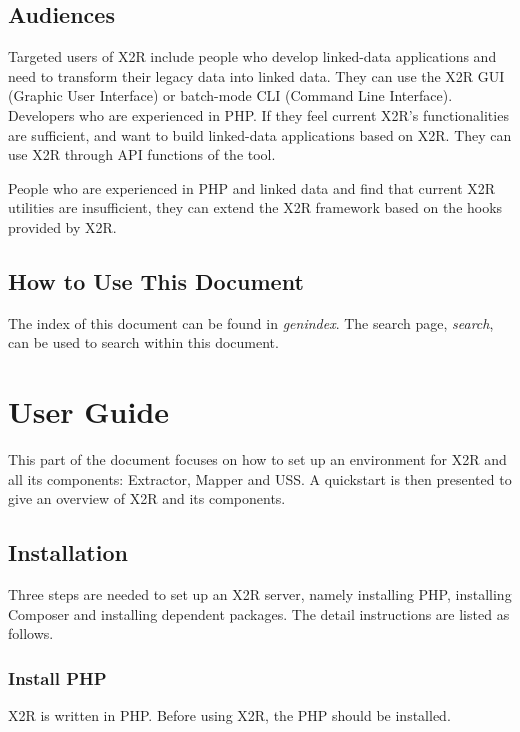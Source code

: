 \documentclass[letterpaper,10pt,english]{sphinxmanual}
\begin{document}
\section{Audiences}
\label{docs/audience:audiences}\label{docs/audience::doc}
Targeted users of X2R include people who develop linked-data applications and need to transform their legacy data into linked data. They can use the X2R GUI (Graphic User Interface) or batch-mode CLI (Command Line Interface). Developers who are experienced in PHP. If they feel current X2R's functionalities are sufficient, and want to build linked-data applications based on X2R. They can use X2R through API functions of the tool.

People who are experienced in PHP and linked data and find that current X2R utilities are insufficient, they can extend the X2R framework based on the hooks provided by X2R.


\section{How to Use This Document}
\label{docs/howto:how-to-use-this-document}\label{docs/howto::doc}
The index of this document can be found in \emph{genindex}. The search page, \emph{search}, can be used to search within this document.


\chapter{User Guide}
\label{index:user-guide}
This part of the document focuses on how to set up an environment for X2R and all its components: Extractor, Mapper and USS. A quickstart is then presented to give an overview of X2R and its components.


\section{Installation}
\label{docs/install:installation}\label{docs/install::doc}\label{docs/install:id1}
Three steps are needed to set up an X2R server, namely installing PHP, installing Composer and installing dependent packages. The detail instructions are listed as follows.


\subsection{Install PHP}
\label{docs/install:install-php}
X2R is written in PHP. Before using X2R, the PHP should be installed.
\end{document}
